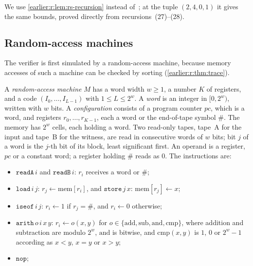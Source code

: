 \begin{remark}\label{earlier:r:rem:bcgt-c1}
We use \cref{earlier:r:lem:rs-recursion} instead of~\cite[Lemma~C.1]{BCGT13}; at the tuple \((2,4,0,1)\) it gives the same bounds, proved directly from recursions~(27)--(28).
\end{remark}

\subsection{Random-access machines}

The verifier is first simulated by a random-access machine, because
memory accesses of such a machine can be checked by sorting
(\cref{earlier:r:thm:trace}).

\begin{definition}\label{earlier:r:def:ram}
A \emph{random-access machine} \(M\) has a word width \(w\ge1\), a
number \(K\) of registers, and a code \((I_0,\ldots,I_{L-1})\) with
\(1\le L\le2^w\). A \emph{word} is an integer in \([0,2^w)\), written
with \(w\) bits. A \emph{configuration} consists of a program counter
\(\mathit{pc}\), which is a word, and registers \(r_0,\ldots,r_{K-1}\),
each a word or the end-of-tape symbol \(\#\). The memory has \(2^w\)
cells, each holding a word. Two read-only tapes, tape~A for the input
and tape~B for the witness, are read in consecutive words of \(w\)
bits; bit \(j\) of a word is the \(j\)-th bit of its block, least
significant first. An operand is a register, \(\mathit{pc}\) or a constant word; a
register holding \(\#\) reads as \(0\). The instructions are:
\begin{itemize}
\item \(\mathtt{readA}\,i\) and \(\mathtt{readB}\,i\): \(r_i\) receives a
word or \(\#\);
\item \(\mathtt{load}\,i\,j\): \(r_j\leftarrow\mathrm{mem}[r_i]\), and
\(\mathtt{store}\,j\,x\): \(\mathrm{mem}[r_j]\leftarrow x\);
\item \(\mathtt{iseof}\,i\,j\): \(r_i\leftarrow1\) if \(r_j=\#\), and
\(r_i\leftarrow0\) otherwise;
\item \(\mathtt{arith}\,o\,i\,x\,y\): \(r_i\leftarrow o(x,y)\) for
\(o\in\{\mathrm{add},\mathrm{sub},\mathrm{and},\mathrm{cmp}\}\), where
addition and subtraction are modulo \(2^w\), \(\mathrm{and}\) is
bitwise, and \(\mathrm{cmp}(x,y)\) is \(1\), \(0\) or \(2^w-1\)
according as \(x<y\), \(x=y\) or \(x>y\);
\item \(\mathtt{nop}\);

\end{itemize}
\end{definition}
